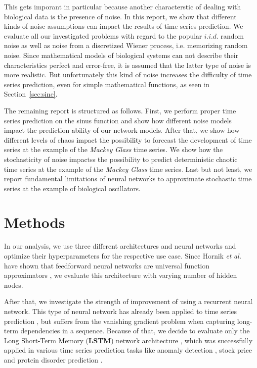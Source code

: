 \documentclass{article}
\begin{document}
This gets imporant in particular because another characterstic of dealing with
biological data is the presence of noise. In
this report, we show that different kinds of noise assumptions can impact the
results of time series prediction. We evaluate all our investigated problems
with regard to the popular $i.i.d.$ random noise as well as noise from a
discretized Wiener process, i.e. memorizing random
noise. Since mathematical models of biological systems can not describe their
characteristics perfect and error-free, it is assumed that the latter type of
noise is more realistic. But unfortunately this kind of noise increases the
difficulty of time series prediction, even for simple mathematical functions,
as seen in Section~\ref{sec:sine}.

The remaining report is structured as follows. First, we perform proper time
series prediction on the sinus function and show how different noise models
impact the prediction ability of our network models. After that, we show how
different levels of chaos impact the possibility to forecast the development
of time series at the example of the \emph{Mackey Glass} time series. We show
how the stochasticity of noise impactss the possibility to predict deterministic
chaotic time series at the example of the \emph{Mackey Glass} time series. Last
but not least, we report fundamental limitations of neural networks to
approximate stochastic time series at the example of biological oscillators.

\section{Methods}

In our analysis, we use three different architectures and neural networks and
optimize their hyperparameters for the respective use case. Since Hornik
\textit{et al.} have shown that feedforward neural networks are universal
function approximators \cite{hornik1989}, we evaluate this architecture with
varying number of hidden nodes.

After that, we investigate the strength of
improvement of using a recurrent neural network. This type of neural network has
already been applied to time series prediction \cite{connor1994}, but suffers
from the vanishing gradient problem when capturing long-term dependencies in a
sequence. Because of that, we decide to evaluate only the Long Short-Term Memory
(\textbf{LSTM})
network architecture \cite{hochreiter1997}, which was successfully applied in
various time series prediction tasks like anomaly detection \cite{malhotra2015},
stock price \cite{fischer2018} and protein disorder prediction
\cite{hanson2016}.
\end{document}

